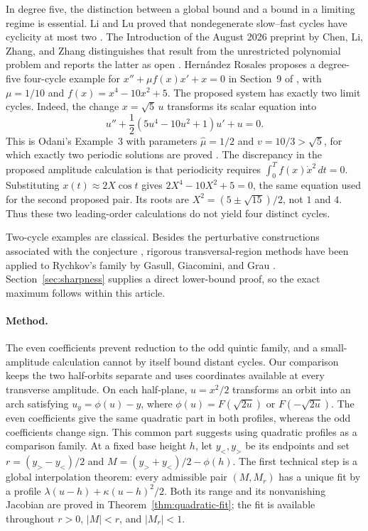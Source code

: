 In degree five, the distinction between a global bound and a
bound in a limiting regime is essential. Li and Lu proved that
nondegenerate slow--fast cycles have cyclicity at most two
\cite{LiLu}. The Introduction of the August 2026 preprint by
Chen, Li, Zhang, and Zhang distinguishes that result from the
unrestricted polynomial problem and reports the latter as open
\cite{CLZZ}. Hern\'andez Rosales proposes a degree-five four-cycle
example for $x''+\mu f(x)x'+x=0$ in Section~9 of \cite{Rosales},
with $\mu=1/10$ and $f(x)=x^4-10x^2+5$. The proposed system has exactly two
limit cycles. Indeed, the change $x=\sqrt5\,u$ transforms its
scalar equation into
\[
 u''+\frac12(5u^4-10u^2+1)u'+u=0.
\]
This is Odani's Example~3 with parameters $\widehat\mu=1/2$ and
$v=10/3>\sqrt5$, for which exactly two periodic solutions are
proved \cite{Odani}. The discrepancy in the proposed amplitude
calculation is that periodicity requires
$\int_0^T f(x)\dot x^2\,dt=0$. Substituting
$x(t)\approx2X\cos t$ gives $2X^4-10X^2+5=0$, the same equation
used for the second proposed pair. Its roots are
$X^2=(5\pm\sqrt{15})/2$, not $1$ and $4$. Thus these two
leading-order calculations do not yield four distinct cycles.

Two-cycle examples are classical. Besides the perturbative
constructions associated with the conjecture \cite{LMP,LlibreZhang},
rigorous transversal-region methods have been applied to Rychkov's
family by Gasull, Giacomini, and Grau \cite{GGG}.
Section~\ref{sec:sharpness} supplies a direct lower-bound proof,
so the exact maximum follows within this article.

\paragraph{Method.}
The even coefficients prevent reduction to the odd quintic family,
and a small-amplitude calculation cannot by itself bound distant
cycles. Our comparison keeps the two half-orbits separate and
uses coordinates available at every transverse amplitude.
On each half-plane, $u=x^2/2$ transforms an orbit into an arch
satisfying $u_y=\phi(u)-y$, where
$\phi(u)=F(\sqrt{2u})$ or $F(-\sqrt{2u})$.
The even coefficients give the same quadratic part in both profiles,
whereas the odd coefficients change sign. This common part suggests
using quadratic profiles as a comparison family.
At a fixed base height $h$, let $y_<,y_>$ be its endpoints and set
$r=(y_>-y_<)/2$ and $M=(y_>+y_<)/2-\phi(h)$.
The first technical step is a global interpolation theorem:
every admissible pair $(M,M_r)$ has a unique fit by a profile
$\lambda(u-h)+\kappa(u-h)^2/2$. Both its range and its
nonvanishing Jacobian are proved in Theorem~\ref{thm:quadratic-fit};
the fit is available throughout $r>0$, $|M|<r$, and $|M_r|<1$.

